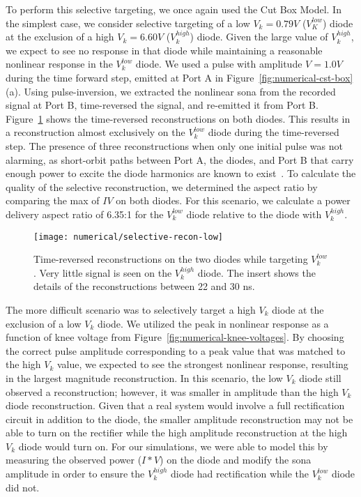 To perform this selective targeting, we once again used the Cut Box Model. In the simplest case, we consider selective targeting of a low $V_{k} = 0.79V$ ($V_K^{low}$) diode at the exclusion of a high $V_{k} = 6.60V$ ($V_k^{high}$) diode. Given the large value of $V_k^{high}$, we expect to see no response in that diode while maintaining a reasonable nonlinear response in the $V_k^{low}$ diode. We used a pulse with amplitude $V = 1.0 V$ during the time forward step, emitted at Port A in Figure~\ref{fig:numerical-cst-box}(a). Using pulse-inversion, we extracted the nonlinear sona from the recorded signal at Port B, time-reversed the signal, and re-emitted it from Port B. Figure~\ref{fig:numerical-selective-recon-low} shows the time-reversed reconstructions on both diodes. This results in a reconstruction almost exclusively on the $V_k^{low}$ diode during the time-reversed step. The presence of three reconstructions when only one initial pulse was not alarming, as short-orbit paths between Port A, the diodes, and Port B that carry enough power to excite the diode harmonics are known to exist~\cite{hansjürgenstöckmann2006}. To calculate the quality of the selective reconstruction, we determined the aspect ratio by comparing the max of $IV$ on both diodes. For this scenario, we calculate a power delivery aspect ratio of 6.35:1 for the $V_k^{low}$ diode relative to the diode with $V_k^{high}$.

\begin{figure}[t]
\centering
\texttt{[image: numerical/selective-recon-low]}
\caption[Selective reconstruction on a $V_{k}^{low}$ diode]{Time-reversed reconstructions on the two diodes while targeting $V_{k}^{low}$. Very little signal is seen on the $V_{k}^{high}$ diode. The insert shows the details of the reconstructions between 22 and 30 ns.}
\label{fig:numerical-selective-recon-low}
\end{figure}

 The more difficult scenario was to selectively target a high $V_k$ diode at the exclusion of a low $V_k$ diode. We utilized the peak in nonlinear response as a function of knee voltage from Figure~\ref{fig:numerical-knee-voltages}. By choosing the correct pulse amplitude corresponding to a peak value that was matched to the high $V_k$ value, we expected to see the strongest nonlinear response, resulting in the largest magnitude reconstruction. In this scenario, the low $V_k$ diode still observed a reconstruction; however, it was smaller in amplitude than the high $V_k$ diode reconstruction. Given that a real system would involve a full rectification circuit in addition to the diode, the smaller amplitude reconstruction may not be able to turn on the rectifier while the high amplitude reconstruction at the high $V_k$ diode would turn on. For our simulations, we were able to model this by measuring the observed power ($I*V$) on the diode and modify the sona amplitude in order to ensure the $V_k^{high}$ diode had rectification while the $V_k^{low}$ diode did not.

